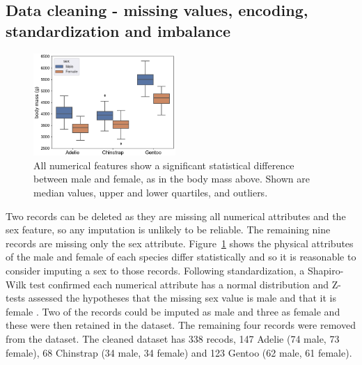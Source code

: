 \documentclass[12pt]{article}
\begin{document}
\vspace{\baselineskip}
\subsection*{Data cleaning - missing values, encoding, standardization and imbalance}

\begin{figure} %
  \centering
  \vspace{-1.5\baselineskip} %
  \includegraphics[width=0.48\textwidth]{sex.png} %
  \vspace{-0.5\baselineskip} %
  \caption{All numerical features show a significant statistical difference between male and female, 
  as in the body mass above. Shown are median values, upper and lower quartiles, 
  and outliers.}
  \vspace{-0.5\baselineskip} %
  \label{fig:sex}
\end{figure}   

Two records can be deleted as they are missing all numerical attributes and the sex feature, so 
any imputation is unlikely to be reliable. 
The remaining nine records are missing only the sex attribute. Figure~\ref{fig:sex} shows the physical 
attributes of the male and female of each species differ statistically and so it is reasonable to 
consider imputing a sex to those records. Following standardization, 
a Shapiro-Wilk test confirmed each numerical attribute has a normal distribution \cite{shapiro1965analysis} 
and Z-tests assessed the 
hypotheses that the missing sex value is male and that it is female \cite{freedman2007statistics}. 
Two of the records could be imputed as male and three as female 
and these were then retained in the dataset. 
The remaining four records were removed from the dataset. 
The cleaned dataset has 338 recods, 147 Adelie  
(74 male, 73 female), 68 Chinstrap (34 male, 34 female) and 123 Gentoo  (62 male, 61 female).
\end{document}
